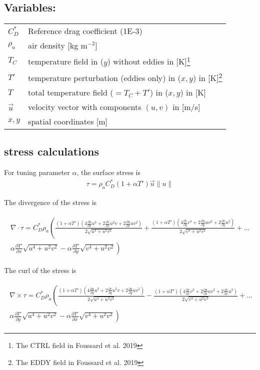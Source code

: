 \documentclass[12pt,a4paper]{article}
\newcommand{\dudx}{\frac{\partial u}{\partial x}}
\newcommand{\dudy}{\frac{\partial u}{\partial y}}
\newcommand{\dvdx}{\frac{\partial v}{\partial x}}
\newcommand{\dvdy}{\frac{\partial v}{\partial y}}
\newcommand{\dTpdx}{\frac{\partial T'}{\partial x}}
\newcommand{\dTpdy}{\frac{\partial T'}{\partial y}}
\begin{document}
\subsection*{Variables:}
\begin{table}[h!]
\begin{tabular}{ll}
 $C_D^*$ &  Reference drag coefficient (1E-3) \\
 $\rho_a$ &  air density [kg m$^{-3}$] \\
 $T_C$ & temperature field in ($y$) without eddies in [K]\footnote{The CTRL field in Foussard et al. 2019}  \\
 $T'$ & temperature perturbation (eddies only) in ($x,y$) in [K]\footnote{The EDDY field in Foussard et al. 2019}  \\
  $T$ & total temperature field ($=T_C + T'$) in ($x,y$) in [K]  \\
 $\vec{u}$ & velocity vector with components $(u,v)$ in [m/s] \\
 $x,y$ & spatial coordinates [m]
\end{tabular}
\end{table}

\subsection*{stress calculations}
For tuning parameter $\alpha$, the surface stress is 
\begin{align*}
\tau = \rho_a C_D^*(1+\alpha T')\vec{u}\lVert u \rVert
\end{align*}

The divergence of the stress is 

\begin{align*}
\begin{split}
\nabla \cdot \tau = C_D^* \rho_a \left( \frac{(1+\alpha T')(4\dudx u^3 + 2 \dvdx u^2 v + 2 \dudx u v^2)}{2\sqrt{u^4+u^2v^2}}+ \frac{(1+\alpha T')(4\dvdy v^3 + 2 \dudy u v^2 + 2 \dvdy u^2)}{2\sqrt{v^4+u^2v^2}}\right.+...\\
\left. \alpha\dTpdx\sqrt{u^4+u^2v^2}-\alpha\dTpdy\sqrt{v^4+u^2v^2} \right)
\end{split}
\end{align*}

The curl of the stress is 

\begin{align*}
\begin{split}
\nabla \times \tau = C_D^* \rho_a \left( \frac{(1+\alpha T')(4\dudy u^3 + 2 \dvdy u^2 v + 2 \dudy u v^2)}{2\sqrt{u^4+u^2v^2}}- \frac{(1+\alpha T')(4\dvdx v^3 + 2 \dudx u v^2 + 2 \dvdx u^2)}{2\sqrt{v^4+u^2v^2}}\right.+...\\
\left. \alpha\dTpdy\sqrt{u^4+u^2v^2}-\alpha\dTpdx\sqrt{v^4+u^2v^2} \right)
\end{split}
\end{align*}
\end{document}
